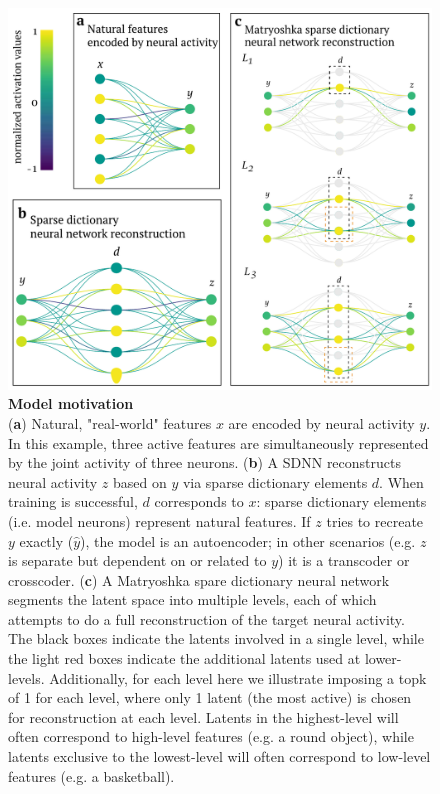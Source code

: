\begin{figure}[h]
    \begin{minipage}{0.63\linewidth}
    \includegraphics[width=\linewidth]{figures/sdnn_arch.pdf}
    \end{minipage}%
    \begin{minipage}{0.37\linewidth}
    \caption{
        \textbf{Model motivation} \\
        \small
        (\textbf{a}) Natural, "real-world" features $x$ are encoded by neural activity $y$. In this example, three active features are simultaneously represented by the joint activity of three neurons. (\textbf{b}) A SDNN reconstructs neural activity $z$ based on $y$ via sparse dictionary elements $d$. When training is successful, $d$ corresponds to $x$: sparse dictionary elements (i.e. model neurons) represent natural features. If $z$ tries to recreate $y$ exactly ($\hat{y}$), the model is an autoencoder; in other scenarios (e.g. $z$ is separate but dependent on or related to $y$) it is a transcoder or crosscoder. (\textbf{c}) A Matryoshka spare dictionary neural network segments the latent space into multiple levels, each of which attempts to do a full reconstruction of the target neural activity. The black boxes indicate the latents involved in a single level, while the light red boxes indicate the additional latents used at lower-levels. Additionally, for each level here we illustrate imposing a topk of 1 for each level, where only 1 latent (the most active) is chosen for reconstruction at each level. Latents in the highest-level will often correspond to high-level features (e.g. a round object), while latents exclusive to the lowest-level will often correspond to low-level features (e.g. a basketball).
    }
    \label{fig:sdnn_arch}
    \end{minipage}
\end{figure}


